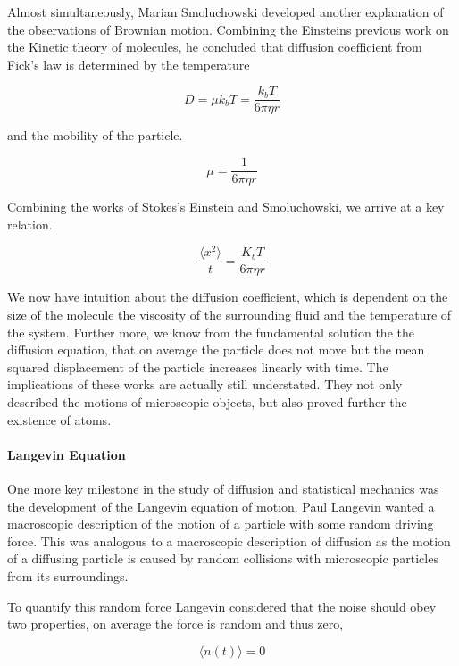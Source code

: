 \documentclass[a4paper,11pt,oneside]{book}
\begin{document}
Almost simultaneously, Marian Smoluchowski developed another explanation of the observations of Brownian motion. Combining the Einsteins previous work on the Kinetic theory of molecules, he concluded that diffusion coefficient from Fick's law is determined by the temperature

\begin{equation}
D = \mu k_b T = \frac{k_b T}{6\pi\eta r}
\end{equation}

and the mobility of the particle.

\begin{equation}
\mu = \frac{1}{6\pi\eta r}
\end{equation}

Combining the works of Stokes's Einstein and Smoluchowski, we arrive at a key relation.

\begin{equation}
\frac{\langle x^2 \rangle}{t} = \frac{K_b T}{6\pi\eta r}
\end{equation}

We now have intuition about the diffusion coefficient, which is dependent on the size of the molecule the viscosity of the surrounding fluid and the temperature of the system. Further more, we know from the fundamental solution the the diffusion equation, that on average the particle does not move
but the mean squared displacement of the particle
increases linearly with time. The implications of these works are actually still understated. They not only described the motions of microscopic objects, but also proved further the existence of atoms.

\paragraph{Langevin Equation}

One more key milestone in the study of diffusion and statistical mechanics was the development of the Langevin equation of motion. Paul Langevin wanted a macroscopic description of the motion of a particle with some random driving force. This was analogous to a macroscopic description of diffusion as the motion of a diffusing particle is caused by random collisions with microscopic particles from its surroundings.

To quantify this random force Langevin considered that the noise should obey two properties, on average the force is random and thus zero,

\begin{equation}
\langle n(t) \rangle = 0
\end{equation}
\end{document}
